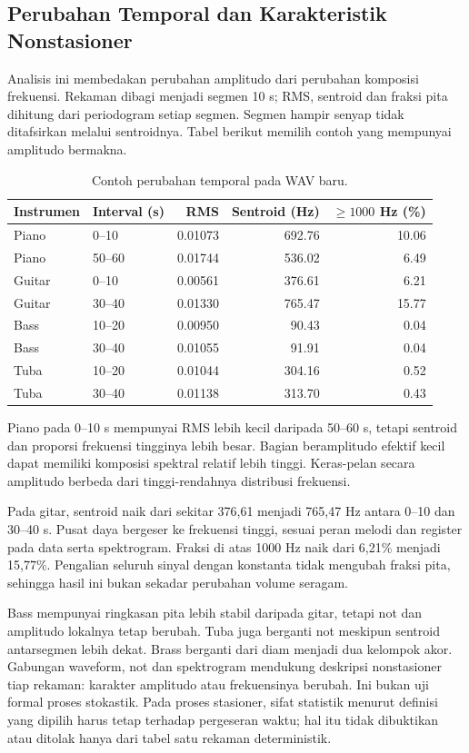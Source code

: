 \subsection{Perubahan Temporal dan Karakteristik Nonstasioner}
Analisis ini membedakan perubahan amplitudo dari perubahan komposisi
frekuensi. Rekaman dibagi menjadi segmen 10 s; RMS, sentroid dan
fraksi pita dihitung dari periodogram setiap segmen. Segmen hampir
senyap tidak ditafsirkan melalui sentroidnya. Tabel berikut memilih
contoh yang mempunyai amplitudo bermakna.
\begin{table}[H]
\centering\small
\caption{Contoh perubahan temporal pada WAV baru.}\label{tab:temporal}
\begin{tabular}{llrrr}
\toprule
Instrumen & Interval (s) & RMS & Sentroid (Hz) & $\geq1000$ Hz (\%) \\
\midrule
Piano & 0--10 & 0.01073 & 692.76 & 10.06 \\
Piano & 50--60 & 0.01744 & 536.02 & 6.49 \\
Guitar & 0--10 & 0.00561 & 376.61 & 6.21 \\
Guitar & 30--40 & 0.01330 & 765.47 & 15.77 \\
Bass & 10--20 & 0.00950 & 90.43 & 0.04 \\
Bass & 30--40 & 0.01055 & 91.91 & 0.04 \\
Tuba & 10--20 & 0.01044 & 304.16 & 0.52 \\
Tuba & 30--40 & 0.01138 & 313.70 & 0.43 \\
\bottomrule
\end{tabular}
\end{table}
Piano pada 0--10 s mempunyai RMS lebih kecil daripada 50--60 s,
tetapi sentroid dan proporsi frekuensi tingginya lebih besar.
Bagian beramplitudo efektif kecil dapat memiliki komposisi spektral
relatif lebih tinggi. Keras-pelan secara amplitudo berbeda dari
tinggi-rendahnya distribusi frekuensi.

Pada gitar, sentroid naik dari sekitar 376,61 menjadi 765,47 Hz
antara 0--10 dan 30--40 s. Pusat daya bergeser ke frekuensi tinggi,
sesuai peran melodi dan register pada data serta spektrogram.
Fraksi di atas 1000 Hz naik dari 6,21\% menjadi 15,77\%.
Pengalian seluruh sinyal dengan konstanta tidak mengubah fraksi
pita, sehingga hasil ini bukan sekadar perubahan volume seragam.

Bass mempunyai ringkasan pita lebih stabil daripada gitar, tetapi
not dan amplitudo lokalnya tetap berubah. Tuba juga berganti not
meskipun sentroid antarsegmen lebih dekat. Brass berganti dari
diam menjadi dua kelompok akor. Gabungan waveform, not dan
spektrogram mendukung deskripsi nonstasioner tiap rekaman: karakter
amplitudo atau frekuensinya berubah. Ini bukan uji formal proses
stokastik. Pada proses stasioner, sifat statistik menurut definisi
yang dipilih harus tetap terhadap pergeseran waktu; hal itu tidak
dibuktikan atau ditolak hanya dari tabel satu rekaman deterministik.

